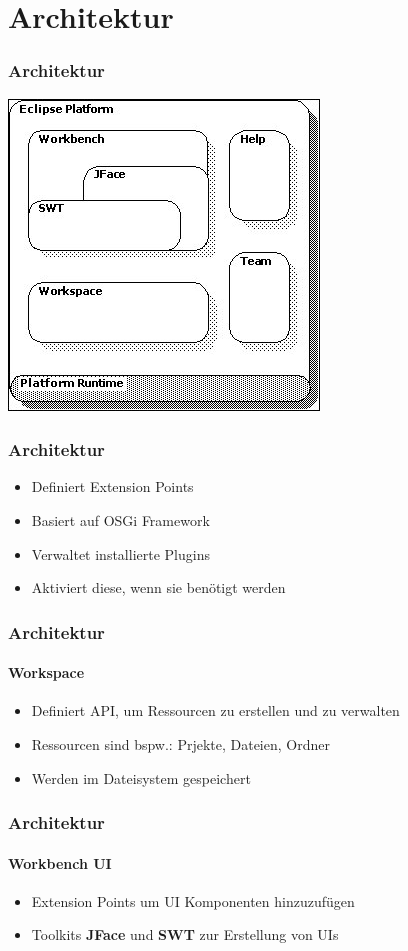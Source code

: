 {\section{Architektur}
\begin{frame}
  \frametitle{Architektur}
  \includegraphics[scale=0.8]{images/architecture.jpg}
\end{frame}

\begin{frame}
  \frametitle{Architektur}
  \begin{itemize}
    \item Definiert Extension Points
    \item Basiert auf OSGi Framework
    \item Verwaltet installierte Plugins
    \item Aktiviert diese, wenn sie benötigt werden
  \end{itemize}
\end{frame}

\begin{frame}
  \frametitle{Architektur}
  \framesubtitle{Workspace}
  \begin{itemize}
    \item Definiert API, um Ressourcen zu erstellen und zu verwalten
    \item Ressourcen sind bspw.: Prjekte, Dateien, Ordner
    \item Werden im Dateisystem gespeichert
  \end{itemize}
\end{frame}

\begin{frame}
  \frametitle{Architektur}
  \framesubtitle{Workbench UI}
  \begin{itemize}
    \item Extension Points um UI Komponenten hinzuzufügen
    \item Toolkits \textbf{JFace} und \textbf{SWT} zur Erstellung von UIs
  \end{itemize}
\end{frame}

}

